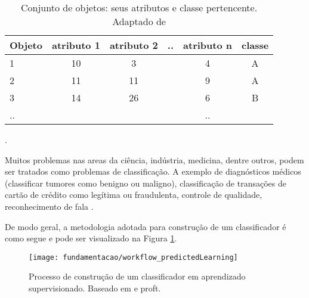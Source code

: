 \begin{table}[!htp]
  \centering
  \begin{tabular}{ |l|c c c c |c|}
    \hline
       {\bf Objeto} & {\bf atributo 1} & {\bf atributo 2} & {\bf ..} & {\bf atributo n} & {\bf classe} \\
    \hline
       1 & 10 & 3 &  & 4 & A \\
    \hline
       2 & 11 & 11 &  & 9 & A \\
    \hline
       3 & 14 & 26 &  & 6 & B \\
    \hline
       .. &  &  &  & .. & \\
    \hline
  \end{tabular}
  \caption{Conjunto de objetos: seus atributos e classe pertencente. Adaptado de \cite{Kotsiantis:2007}}.
  \label{table:dsex1}
\end{table}

Muitos problemas nas areas da ciência, indústria, medicina, dentre outros, podem ser tratados como problemas de classificação. A exemplo de diagnósticos médicos (classificar tumores como benigno ou maligno), classificação de transações de cartão de crédito como legítima ou fraudulenta, controle de qualidade, reconhecimento de fala \cite{Zhang:2000}. 

De modo geral, a metodologia adotada para construção de um classificador é como segue e pode ser visualizado na Figura \ref{fig:slclassification}.

\begin{figure}[!htb] \centering 
  \centering
  \texttt{[image: fundamentacao/workflow\_predictedLearning]} 
  \caption{Processo de construção de um classificador em aprendizado supervisionado. Baseado em \cite{Kotsiantis:2007} e proft\footnotemark.}
  \label{fig:slclassification}
\end{figure}

